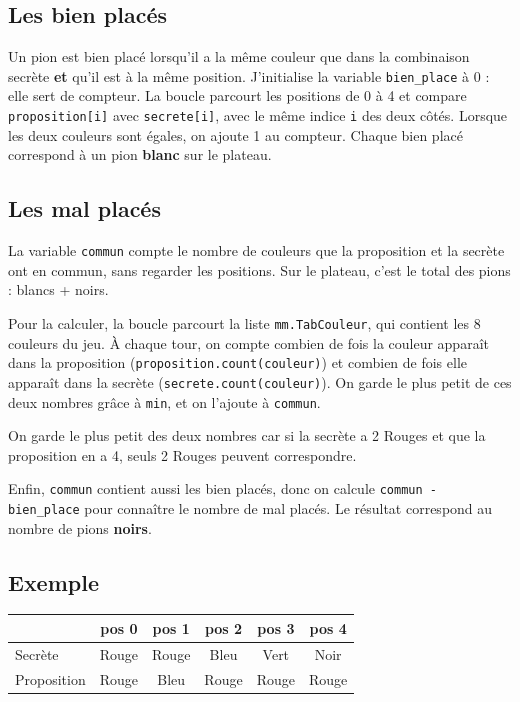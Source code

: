 \documentclass[11pt,a4paper]{article}
\begin{document}
\subsection*{Les bien placés}

Un pion est bien placé lorsqu'il a la même couleur que dans la combinaison
secrète \textbf{et} qu'il est à la même position. J'initialise la variable
\texttt{bien\_place} à 0 : elle sert de compteur. La boucle parcourt les
positions de 0 à 4 et compare \texttt{proposition[i]} avec
\texttt{secrete[i]}, avec le même indice \texttt{i} des deux côtés.
Lorsque les deux couleurs sont égales, on ajoute 1 au compteur.
Chaque bien placé correspond à un pion \textbf{blanc} sur le plateau.

\subsection*{Les mal placés}

La variable \texttt{commun} compte le nombre de couleurs que la proposition et la secrète ont en commun, sans regarder les positions. Sur le plateau, c'est le total des pions : blancs + noirs.

Pour la calculer, la boucle parcourt la liste \texttt{mm.TabCouleur}, qui contient les 8 couleurs du jeu. À chaque tour, on compte combien de fois la couleur apparaît dans la proposition (\texttt{proposition.count(couleur)}) et combien de fois elle apparaît dans la secrète (\texttt{secrete.count(couleur)}). On garde le plus petit de ces deux nombres grâce à \texttt{min}, et on l'ajoute à \texttt{commun}.

On garde le plus petit des deux nombres car si la secrète a 2 Rouges et que la proposition en a 4, seuls 2 Rouges peuvent correspondre.

Enfin, \texttt{commun} contient aussi les bien placés, donc on calcule \texttt{commun - bien\_place} pour connaître le nombre de mal placés.
Le résultat correspond au nombre de pions \textbf{noirs}.

\subsection*{Exemple}

\begin{center}
\begin{tabular}{lccccc}
\toprule
 & pos 0 & pos 1 & pos 2 & pos 3 & pos 4 \\
\midrule
Secrète     & Rouge & Rouge & Bleu  & Vert  & Noir \\
Proposition & Rouge & Bleu  & Rouge & Rouge & Rouge \\
\bottomrule
\end{tabular}
\end{center}
\end{document}
